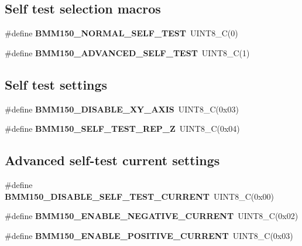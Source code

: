 \subsection*{Self test selection macros}
\begin{DoxyCompactItemize}
\item 
\mbox{\label{group___b_m_m150_ga21a50f901e3c91533b1039783ff3c3e8}} 
\#define {\bfseries B\+M\+M150\+\_\+\+N\+O\+R\+M\+A\+L\+\_\+\+S\+E\+L\+F\+\_\+\+T\+E\+ST}~U\+I\+N\+T8\+\_\+C(0)
\item 
\mbox{\label{group___b_m_m150_ga984a8b62f060a27edc983be819891ed8}} 
\#define {\bfseries B\+M\+M150\+\_\+\+A\+D\+V\+A\+N\+C\+E\+D\+\_\+\+S\+E\+L\+F\+\_\+\+T\+E\+ST}~U\+I\+N\+T8\+\_\+C(1)
\end{DoxyCompactItemize}
\subsection*{Self test settings}
\begin{DoxyCompactItemize}
\item 
\mbox{\label{group___b_m_m150_ga135d16dc4d0b11f1ef9cdd3473eb20f6}} 
\#define {\bfseries B\+M\+M150\+\_\+\+D\+I\+S\+A\+B\+L\+E\+\_\+\+X\+Y\+\_\+\+A\+X\+IS}~U\+I\+N\+T8\+\_\+C(0x03)
\item 
\mbox{\label{group___b_m_m150_gad0fc8ca82bf767772bf6de22435586f3}} 
\#define {\bfseries B\+M\+M150\+\_\+\+S\+E\+L\+F\+\_\+\+T\+E\+S\+T\+\_\+\+R\+E\+P\+\_\+Z}~U\+I\+N\+T8\+\_\+C(0x04)
\end{DoxyCompactItemize}
\subsection*{Advanced self-\/test current settings}
\begin{DoxyCompactItemize}
\item 
\mbox{\label{group___b_m_m150_gaf43ab256292412c2da888afc50fe8614}} 
\#define {\bfseries B\+M\+M150\+\_\+\+D\+I\+S\+A\+B\+L\+E\+\_\+\+S\+E\+L\+F\+\_\+\+T\+E\+S\+T\+\_\+\+C\+U\+R\+R\+E\+NT}~U\+I\+N\+T8\+\_\+C(0x00)
\item 
\mbox{\label{group___b_m_m150_gab61c664178d7c5b228c042e3f9d76cf6}} 
\#define {\bfseries B\+M\+M150\+\_\+\+E\+N\+A\+B\+L\+E\+\_\+\+N\+E\+G\+A\+T\+I\+V\+E\+\_\+\+C\+U\+R\+R\+E\+NT}~U\+I\+N\+T8\+\_\+C(0x02)
\item 
\mbox{\label{group___b_m_m150_ga2a1b4df27073e27003c9e401b4f6b941}} 
\#define {\bfseries B\+M\+M150\+\_\+\+E\+N\+A\+B\+L\+E\+\_\+\+P\+O\+S\+I\+T\+I\+V\+E\+\_\+\+C\+U\+R\+R\+E\+NT}~U\+I\+N\+T8\+\_\+C(0x03)
\end{DoxyCompactItemize}
